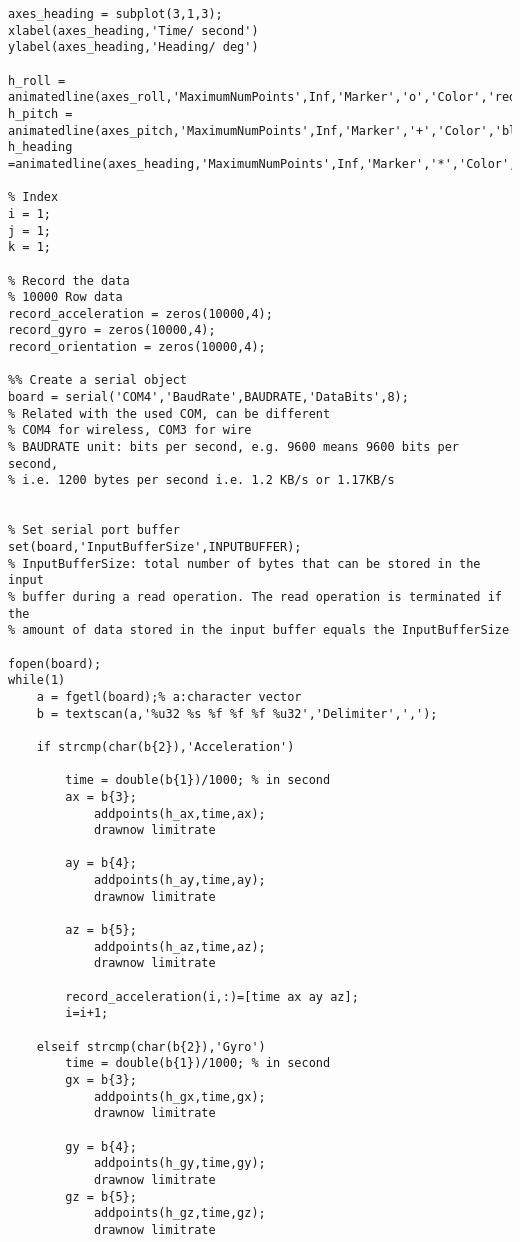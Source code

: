 \begin{lstlisting}
axes_heading = subplot(3,1,3);
xlabel(axes_heading,'Time/ second')
ylabel(axes_heading,'Heading/ deg')

h_roll = animatedline(axes_roll,'MaximumNumPoints',Inf,'Marker','o','Color','red');
h_pitch = animatedline(axes_pitch,'MaximumNumPoints',Inf,'Marker','+','Color','blue');
h_heading =animatedline(axes_heading,'MaximumNumPoints',Inf,'Marker','*','Color','green');

% Index 
i = 1;
j = 1;
k = 1;

% Record the data
% 10000 Row data
record_acceleration = zeros(10000,4);
record_gyro = zeros(10000,4);
record_orientation = zeros(10000,4);

%% Create a serial object
board = serial('COM4','BaudRate',BAUDRATE,'DataBits',8);
% Related with the used COM, can be different 
% COM4 for wireless, COM3 for wire
% BAUDRATE unit: bits per second, e.g. 9600 means 9600 bits per second,
% i.e. 1200 bytes per second i.e. 1.2 KB/s or 1.17KB/s


% Set serial port buffer
set(board,'InputBufferSize',INPUTBUFFER);
% InputBufferSize: total number of bytes that can be stored in the input
% buffer during a read operation. The read operation is terminated if the
% amount of data stored in the input buffer equals the InputBufferSize

fopen(board);
while(1)
    a = fgetl(board);% a:character vector
    b = textscan(a,'%u32 %s %f %f %f %u32','Delimiter',',');
    
    if strcmp(char(b{2}),'Acceleration')
    
        time = double(b{1})/1000; % in second
        ax = b{3}; 
            addpoints(h_ax,time,ax);
            drawnow limitrate
             
        ay = b{4};
            addpoints(h_ay,time,ay);
            drawnow limitrate
            
        az = b{5};
            addpoints(h_az,time,az);
            drawnow limitrate
            
        record_acceleration(i,:)=[time ax ay az];
        i=i+1;
        
    elseif strcmp(char(b{2}),'Gyro')
        time = double(b{1})/1000; % in second
        gx = b{3}; 
            addpoints(h_gx,time,gx);
            drawnow limitrate
            
        gy = b{4};
            addpoints(h_gy,time,gy);
            drawnow limitrate
        gz = b{5};
            addpoints(h_gz,time,gz);
            drawnow limitrate
            

\end{lstlisting}
